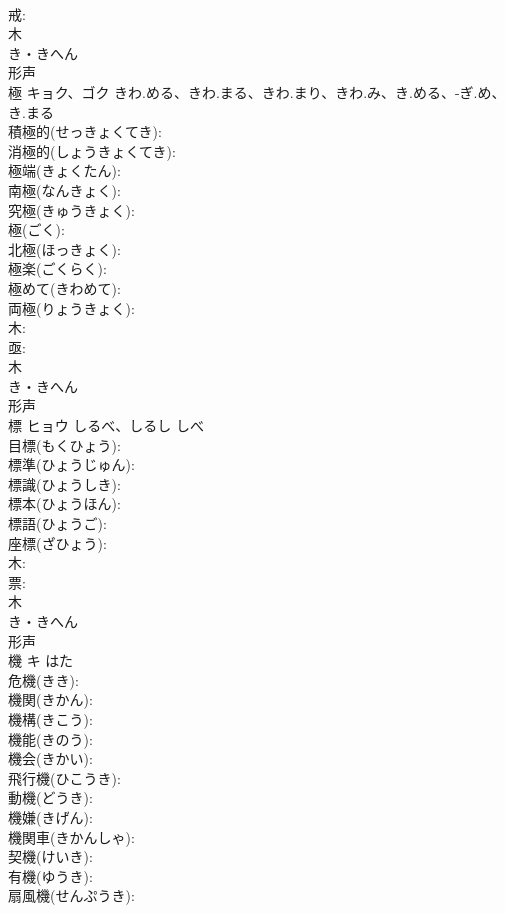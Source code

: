 \documentclass[8pt]{extreport}
\begin{document}
\begin{CJK}{UTF8}{min}
\\	戒: 
\\	木	
\\	き・きへん	
\\	形声 
\\	極	キョク、ゴク	きわ.める、きわ.まる、きわ.まり、きわ.み、き.める、-ぎ.め、き.まる		
\\	積極的(せっきょくてき): 
\\	消極的(しょうきょくてき): 
\\	極端(きょくたん): 
\\	南極(なんきょく): 
\\	究極(きゅうきょく): 
\\	極(ごく): 
\\	北極(ほっきょく): 
\\	極楽(ごくらく): 
\\	極めて(きわめて): 
\\	両極(りょうきょく): 
\\	木: 
\\	亟: 
\\	木	
\\	き・きへん	
\\	形声 
\\	標	ヒョウ	しるべ、しるし	しべ	
\\	目標(もくひょう): 
\\	標準(ひょうじゅん): 
\\	標識(ひょうしき): 
\\	標本(ひょうほん): 
\\	標語(ひょうご): 
\\	座標(ざひょう): 
\\	木: 
\\	票: 
\\	木	
\\	き・きへん	
\\	形声 
\\	機	キ	はた		
\\	危機(きき): 
\\	機関(きかん): 
\\	機構(きこう): 
\\	機能(きのう): 
\\	機会(きかい): 
\\	飛行機(ひこうき): 
\\	動機(どうき): 
\\	機嫌(きげん): 
\\	機関車(きかんしゃ): 
\\	契機(けいき): 
\\	有機(ゆうき): 
\\	扇風機(せんぷうき): 

\end{CJK}
\end{document}
